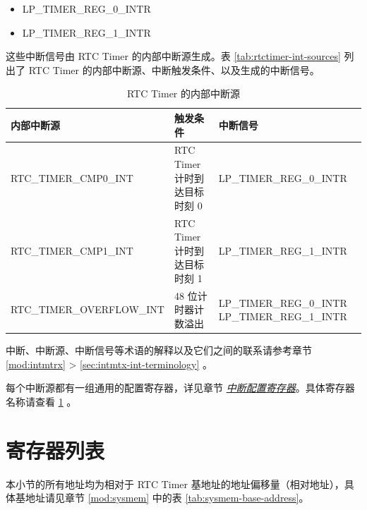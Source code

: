 \documentclass[main\_\_CN.tex]{subfiles}
\begin{document}
    \begin{itemize}
        \item LP\_TIMER\_REG\_0\_INTR
        \item LP\_TIMER\_REG\_1\_INTR
    \end{itemize}

这些中断信号由 RTC Timer 的内部中断源生成。表 \ref{tab:rtctimer-int-sources} 列出了 RTC Timer 的内部中断源、中断触发条件、以及生成的中断信号。

\begin{longtable}{ | L{5cm} | L{6.5cm} | L{4cm} | }
\caption{RTC Timer 的内部中断源} \label{tab:rtctimer-int-sources}
\\ \hline
{}
\textbf{内部中断源} & \textbf{触发条件}  &  \textbf{中断信号}\\ \hline
\label{int:RTCTIMERCMP0INT}RTC\_TIMER\_CMP0\_INT &  RTC Timer 计时到达目标时刻 0 & LP\_TIMER\_REG\_0\_INTR  \\ \hline
\label{int:RTCTIMERCMP1INT}RTC\_TIMER\_CMP1\_INT &  RTC Timer 计时到达目标时刻 1 & LP\_TIMER\_REG\_1\_INTR \\ \hline
\label{int:RTCTIMEROVERFLOWINT}RTC\_TIMER\_OVERFLOW\_INT & 48 位计时器计数溢出 & LP\_TIMER\_REG\_0\_INTR  LP\_TIMER\_REG\_1\_INTR\\ \hline
\end{longtable}

\begin{tiplisting}
中断、中断源、中断信号等术语的解释以及它们之间的联系请参考章节 \ref{mod:intmtrx} \textit{} > \ref{sec:intmtx-int-terminology} \textit{}。
\end{tiplisting}

每个中断源都有一组通用的配置寄存器，详见章节 \hyperref[interrupt-config-registers]{\textit{中断配置寄存器}}。具体寄存器名称请查看 \ref{sec:rtctimer-reg-summ} \textit{}。




\newpage
\hypertarget{rtctimer-reg-summ}{}
\section{寄存器列表}
\label{sec:rtctimer-reg-summ}

本小节的所有地址均为相对于 RTC Timer 基地址的地址偏移量（相对地址），具体基地址请见章节 \ref{mod:sysmem} \textit{} 中的表 \ref{tab:sysmem-base-address}。
\end{document}
